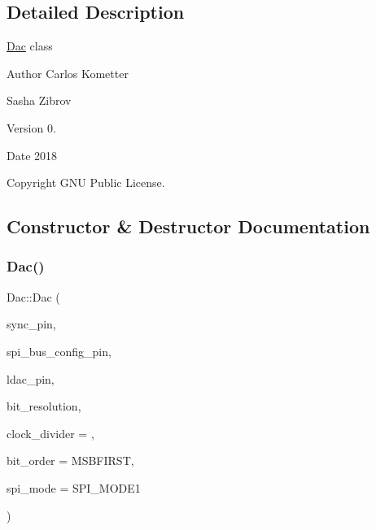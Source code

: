 \subsection{Detailed Description}
\mbox{\hyperlink{classDac}{Dac}} class \begin{DoxyAuthor}{Author}
Carlos Kometter 

Sasha Zibrov 
\end{DoxyAuthor}
\begin{DoxyVersion}{Version}
0. 
\end{DoxyVersion}
\begin{DoxyDate}{Date}
2018 
\end{DoxyDate}
\begin{DoxyCopyright}{Copyright}
G\+NU Public License. 
\end{DoxyCopyright}


\subsection{Constructor \& Destructor Documentation}
\mbox{\label{classDac_a43b0ea171bf0dfad95427e9751b6e191}} 
\subsubsection{\texorpdfstring{Dac()}{Dac()}}
{\footnotesize\ttfamily Dac\+::\+Dac (\begin{DoxyParamCaption}\item[{uint8\+\_\+t}]{sync\+\_\+pin,  }\item[{uint8\+\_\+t}]{spi\+\_\+bus\+\_\+config\+\_\+pin,  }\item[{uint8\+\_\+t}]{ldac\+\_\+pin,  }\item[{uint8\+\_\+t}]{bit\+\_\+resolution,  }\item[{uint8\+\_\+t}]{clock\+\_\+divider = {},  }\item[{Bit\+Order}]{bit\+\_\+order = {\ttfamily MSBFIRST},  }\item[{uint8\+\_\+t}]{spi\+\_\+mode = {\ttfamily SPI\+\_\+MODE1} }\end{DoxyParamCaption})}

